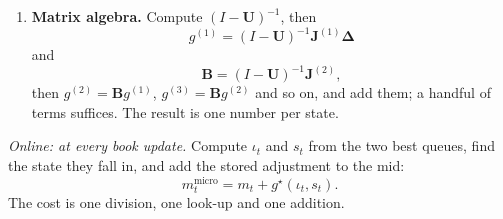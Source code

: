 \begin{enumerate}[leftmargin=1.8em,itemsep=2pt]
  transition by the total number of transitions out of that state. This gives $\mathbf{U}$ (moves to
  another state, mid unchanged), $\mathbf{J}^{(1)}$ (mid moves by each possible amount) and
  $\mathbf{J}^{(2)}$ (moves to another state, mid changed). Each row of $\mathbf{U}$ and
  $\mathbf{J}^{(1)}$ together sums to one.
\item \textbf{Matrix algebra.} Compute $(I - \mathbf{U})^{-1}$, then 
\[
  g^{(1)} = (I -
  \mathbf{U})^{-1}\mathbf{J}^{(1)}\boldsymbol{\Delta}
\]
and 
\[
  \mathbf{B} = (I -
  \mathbf{U})^{-1}\mathbf{J}^{(2)},
\]
then $g^{(2)} = \mathbf{B}g^{(1)}$, $g^{(3)} = \mathbf{B}g^{(2)}$
  and so on, and add them; a handful of terms suffices. The result is one number per state.
\end{enumerate}

\emph{Online: at every book update.} Compute $\iota_t$ and $s_t$ from the two best queues, find the
state they fall in, and add the stored adjustment to the mid: 
\[
  m^{\text{micro}}_t = m_t +
g^{\star}(\iota_t, s_t).
\]
The cost is one division, one look-up and one addition.

